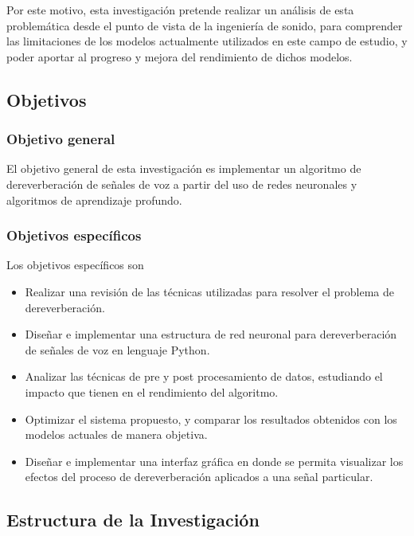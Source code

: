 Por este motivo, esta investigación pretende realizar un análisis de esta problemática desde el punto de vista de la ingeniería de sonido, para comprender las limitaciones de los modelos actualmente utilizados en este campo de estudio, y poder aportar al progreso y mejora del rendimiento de dichos modelos. 

\subsection{Objetivos}
\subsubsection{Objetivo general}

El objetivo general de esta investigación es implementar un algoritmo de dereverberación de señales de voz a partir del uso de redes neuronales y algoritmos de aprendizaje profundo. 

\subsubsection{Objetivos específicos}

Los objetivos específicos son 
\begin{itemize}
    \item Realizar una revisión de las técnicas utilizadas para resolver el problema de dereverberación.
    \item Diseñar e implementar una estructura de red neuronal para dereverberación de señales de voz en lenguaje Python.
    \item Analizar las técnicas de pre y post procesamiento de datos, estudiando el impacto que tienen en el rendimiento del algoritmo.
    \item Optimizar el sistema propuesto, y comparar los resultados obtenidos con los modelos actuales de manera objetiva.
    \item Diseñar e implementar una interfaz gráfica en donde se permita visualizar los efectos del proceso de dereverberación aplicados a una señal particular. 
\end{itemize}

\subsection{Estructura de la Investigación}
